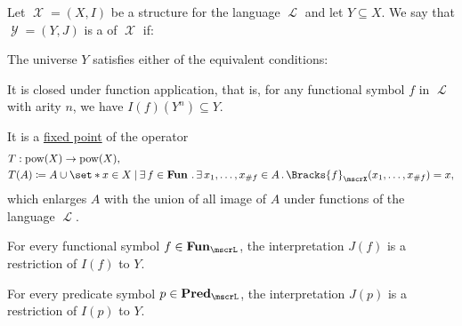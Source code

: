 \begin{definition}\label{def:first_order_substructure}
  Let \( \mscrX = (X, I) \) be a structure for the language \( \mscrL \) and let \( Y \subseteq X \). We say that \( \mscrY = (Y, J) \) is a  of \( \mscrX \) if:

  \begin{thmenum}
     The universe \( Y \) satisfies either of the equivalent conditions:

    \begin{thmenum}
       It is closed under function application, that is, for any functional symbol \( f \) in \( \mscrL \) with arity \( n \), we have \( I(f)(Y^n) \subseteq Y \).

       It is a \hyperref[def:fixed_point]{fixed point} of the operator
      \begin{equation*}
        \begin{aligned}
          &T: \pow(X) \to \pow(X), \\
          &T(A) \coloneqq A \cup \set*{ x \in X \given \qexists{f \in \boldop{Fun}} \qexists{x_1, \ldots, x_{\#f} \in A} \Bracks{f}_\mscrX(x_1, \ldots, x_{\#f}) = x },
        \end{aligned}
      \end{equation*}
      which enlarges \( A \) with the union of all image of \( A \) under functions of the language \( \mscrL \).
    \end{thmenum}

     For every functional symbol \( f \in \boldop{Fun}_\mscrL \), the interpretation \( J(f) \) is a restriction of \( I(f) \) to \( Y \).

     For every predicate symbol \( p \in \boldop{Pred}_\mscrL \), the interpretation \( J(p) \) is a restriction of \( I(p) \) to \( Y \).
  \end{thmenum}
\end{definition}

